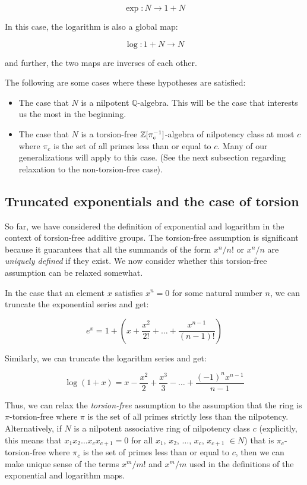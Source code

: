 $$\exp:N \to 1 + N$$

In this case, the logarithm is also a global map:

$$\log:1 + N \to N$$

and further, the two maps are inverses of each other.

The following are some cases where these hypotheses are satisfied:

\begin{itemize}
\item The case that $N$ is a nilpotent $\mathbb{Q}$-algebra. This will
  be the case that interests us the most in the beginning.
\item The case that $N$ is a torsion-free $\mathbb{Z}[\pi_c^{-1}]$-algebra of
  nilpotency class at most $c$ where $\pi_c$ is the set of all primes
  less than or equal to $c$. Many of our generalizations will apply to
  this case. (See the next subsection regarding relaxation to the
  non-torsion-free case).
\end{itemize}

\subsection{Truncated exponentials and the case of torsion}\label{sec:truncated-exponentials}

So far, we have considered the definition of exponential and logarithm
in the context of torsion-free additive groups. The torsion-free
assumption is significant because it guarantees that all the summands
of the form $x^n/n!$ or $x^n/n$ are {\em uniquely defined} if they
exist. We now consider whether this torsion-free assumption can be
relaxed somewhat.

In the case that an element $x$ satisfies $x^n = 0$ for some natural
number $n$, we can truncate the exponential series and get:

$$e^x = 1 + \left(x + \frac{x^2}{2!} + \dots + \frac{x^{n-1}}{(n - 1)!}\right)$$

Similarly, we can truncate the logarithm series and get:

$$\log(1 + x) = x - \frac{x^2}{2} + \frac{x^3}{3} - \dots + \frac{(-1)^nx^{n-1}}{n - 1}$$

Thus, we can relax the {\em torsion-free} assumption to the assumption
that the ring is $\pi$-torsion-free where $\pi$ is the set of all
primes strictly less than the nilpotency. Alternatively, if $N$ is a
nilpotent associative ring of nilpotency class $c$ (explicitly, this
means that $x_1x_2 \dots x_cx_{c+1} = 0$ for all $x_1$, $x_2$,
$\dots$, $x_c$, $x_{c+1}$ $\in N$) that is
$\pi_c$-torsion-free where $\pi_c$ is the set of primes less than or
equal to $c$, then we can make unique sense of the terms $x^m/m!$ and
$x^m/m$ used in the definitions of the exponential and logarithm maps.

